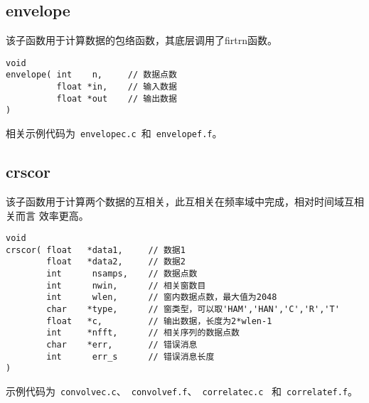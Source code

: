 \subsection{envelope}
该子函数用于计算数据的包络函数，其底层调用了firtrn函数。
\begin{lstlisting}[style=C]
void                                                                                
envelope( int    n,     // 数据点数
          float *in,    // 输入数据
          float *out    // 输出数据
)
\end{lstlisting}

相关示例代码为~\lstinline{envelopec.c}~和~\lstinline{envelopef.f}。

\subsection{crscor}
该子函数用于计算两个数据的互相关，此互相关在频率域中完成，相对时间域互相关而言
效率更高。

\begin{lstlisting}[style=C]
void                                                                                  
crscor( float   *data1,     // 数据1
        float   *data2,     // 数据2                                       
        int      nsamps,    // 数据点数                                               
        int      nwin,      // 相关窗数目                                            
        int      wlen,      // 窗内数据点数，最大值为2048
        char    *type,      // 窗类型，可以取'HAM','HAN','C','R','T'
        float   *c,         // 输出数据，长度为2*wlen-1
        int     *nfft,      // 相关序列的数据点数                            
        char    *err,       // 错误消息                                  
        int      err_s      // 错误消息长度
)
\end{lstlisting}

示例代码为~\lstinline{convolvec.c}、~\lstinline{convolvef.f}、~\lstinline{correlatec.c}~
和~\lstinline{correlatef.f}。
